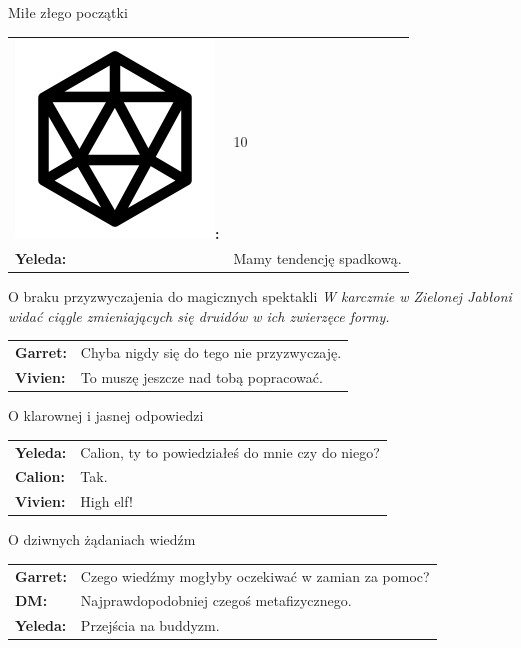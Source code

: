 \documentclass[10pt,twoside,twocolumn]{book}
\begin{document}
\begin{rpg-quotebox}{Miłe złego początki}
\begin{tabularx}{\columnwidth}{lX}
      \includegraphics[scale=0.06]{img/d20.png}\textbf{:}& 10\\
      \textbf{Yeleda:} & Mamy tendencję spadkową.\\
   \end{tabularx}
\end{rpg-quotebox}

\begin{rpg-quotebox}{O braku przyzwyczajenia do magicznych spektakli}
   \textit{W karczmie w Zielonej Jabłoni widać ciągle zmieniających się druidów w ich zwierzęce formy.}\\

   \begin{tabularx}{\columnwidth}{lX}
      \textbf{Garret:} & Chyba nigdy się do tego nie przyzwyczaję.\\
      \textbf{Vivien:} & To muszę jeszcze nad tobą popracować.\\
   \end{tabularx}
\end{rpg-quotebox}

\begin{rpg-quotebox}{O klarownej i jasnej odpowiedzi}
   \begin{tabularx}{\columnwidth}{lX}
      \textbf{Yeleda:} & Calion, ty to powiedziałeś do mnie czy do niego?\\
      \textbf{Calion:} & Tak.\\
      \textbf{Vivien:} & High elf!\\
   \end{tabularx}
\end{rpg-quotebox}

\begin{rpg-quotebox}{O dziwnych żądaniach wiedźm}
   \begin{tabularx}{\columnwidth}{lX}
      \textbf{Garret:} & Czego wiedźmy mogłyby oczekiwać w zamian za pomoc?\\
      \textbf{DM:} & Najprawdopodobniej czegoś metafizycznego.\\
      \textbf{Yeleda:} & Przejścia na buddyzm.\\
   \end{tabularx}
\end{rpg-quotebox}
\end{document}
